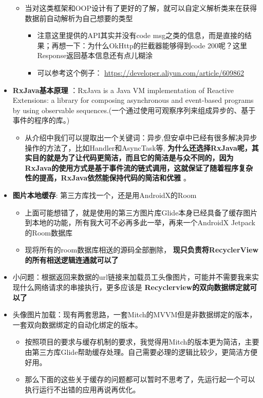 \documentclass[9pt, b5paper]{article}
\begin{document}
\begin{itemize}
\begin{itemize}
\item 当对这类框架和OOP设计有了更好的了解，就可以自定义解析类来在获得数据前自动解析为自己想要的类型
\begin{itemize}
\item 注意这里提供的API其实并没有code msg之类的信息，而是直接的结果；再想一下：为什么OkHttp的拦截器能够得到code 200呢？这里Response返回基本信息还有点儿糊涂
\item 可以参考这个例子： \url{https://developer.aliyun.com/article/609862}
\end{itemize}
\end{itemize}
\item \textbf{RxJava基本原理} ：RxJava is a Java VM implementation of Reactive Extensions: a library for composing asynchronous and event-based programs by using observable sequences.(一个通过使用可观察序列来组成异步的、基于事件的程序的库。)
\begin{itemize}
\item 从介绍中我们可以提取出一个关键词：异步,但安卓中已经有很多解决异步操作的方法了，比如Handler和AsyncTask等, \textbf{为什么还选择RxJava呢，其实目的就是为了让代码更简洁，而且它的简洁是与众不同的，因为RxJava的使用方式是基于事件流的链式调用，这就保证了随着程序复杂性的提高，RxJava依然能保持代码的简洁和优雅} 。
\end{itemize}
\item \textbf{图片本地缓存}: 第三方库找一个，还是用AndroidX的Room
\begin{itemize}
\item 上面可能想错了，就是使用的第三方图片库Glide本身已经具备了缓存图片到本地的功能，所有我大可不必再多此一举，再来一个AndroidX Jetpack的Room数据库
\item 现将所有的room数据库相送的源码全部删除， \textbf{现只负责将RecyclerView的所有相送逻辑连通就可以了}
\end{itemize}
\item 小问题：根据返回来数据的url链接来加载员工头像图片，可能并不需要我来实现什么网络请求的串接执行，更多应该是 \textbf{Recyclerview的双向数据绑定就可以了}
\item 头像图片加载：现有两套思路，一套Mitch的MVVM但是非数据绑定的版本，一套双向数据绑定的自动化绑定的版本。
\begin{itemize}
\item 按照项目的要求与缓存机制的要求，我觉得用Mitch的版本更为简洁，主要由第三方库Glide帮助缓存处理。自己需要必理的逻辑比较少，更简洁方便好用。
\item 那么下面的这些关于缓存的问题都可以暂时不思考了，先运行起一个可以执行运行不出错的应用再说再优化。

\end{itemize}
\end{itemize}
\end{document}
